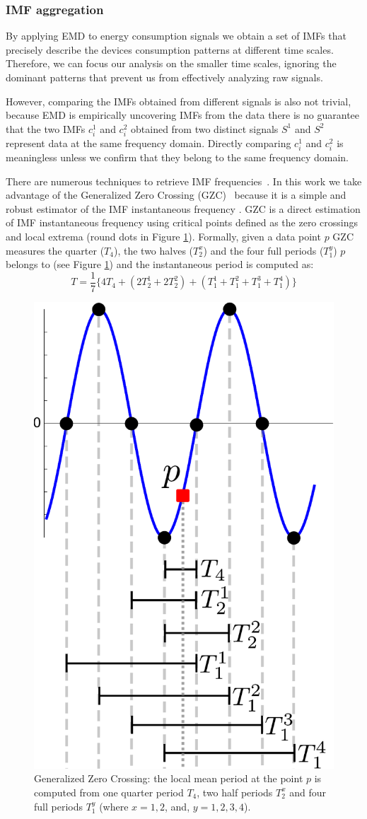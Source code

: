 \subsubsection{IMF aggregation} \label{methodo:corr}
By applying EMD to energy consumption signals we obtain a set of IMFs that precisely describe the devices consumption 
patterns at different time scales.  Therefore, we can focus our analysis on the smaller time scales, ignoring the dominant 
patterns that prevent us from effectively analyzing raw signals.

However, comparing the IMFs obtained from different signals is also not trivial,
 because EMD is empirically uncovering IMFs from the data there is no guarantee that the two IMFs $c_i^1$ and $c_i^2$ obtained from two distinct signals $S^1$ and $S^2$ represent data at the same frequency domain.
Directly comparing $c_i^1$ and $c_i^2$ is meaningless unless we confirm that they belong to the same frequency domain.

There are numerous techniques to retrieve IMF frequencies~\cite{huang:aada2009}.  
In this work we take advantage of the Generalized Zero Crossing (GZC)~\cite{huang:patent2006} because it is a simple and robust 
estimator of the IMF instantaneous frequency \cite{huang:aada2009}.
GZC is a direct estimation of IMF instantaneous frequency using critical points defined as the zero crossings and local extrema 
(round dots in Figure \ref{fig:gzc}).
Formally, given a data point $p$ GZC measures the quarter ($T_4$), the two halves ($T_2^x$) and the four full periods ($T_1^y$) $p$  belongs to (see Figure \ref{fig:gzc}) and the instantaneous period is computed as:
\[T=\frac{1}{7}\{4T_4+(2T_2^1+2T_2^2)+(T_1^1+T_1^2+T_1^3+T_1^4)\}\]

\begin{figure}
\begin{center}
 \includegraphics[width=.25\textwidth]{img/gzc.pdf}
 \end{center}
 \caption{Generalized Zero Crossing: the local mean period at the point $p$ is computed from one quarter period $T_4$, two half periods $T_2^x$ and four full periods $T_1^y$ (where $x=1, 2$, and, $y=1,2,3,4$).}
 \label{fig:gzc}
\end{figure}

